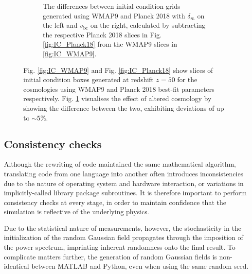 \documentclass[floats,floatfix,showpacs,amssymb,prd,superscriptaddress,nofootinbib, 11pt]{revtex4-2} %
\newcommand{\red}{\textcolor{red}}
\begin{document}
\begin{figure}
\begin{subfigure}[b]{0.9\textwidth}
         \caption{The differences between initial condition grids generated using WMAP9 and Planck 2018 with $\delta_m$ on the left and $v_{\text{bc}}$ on the right, calculated by subtracting the respective Planck 2018 slices in Fig. \ref{fig:IC_Planck18} from the WMAP9 slices in \ref{fig:IC_WMAP9}.}
         \label{fig:IC_difference_WMAP9_Planck18}
     \end{subfigure}
        \caption{Fig. \ref{fig:IC_WMAP9} and Fig. \ref{fig:IC_Planck18} show slices of initial condition boxes generated at redshift $z = 50$ for the cosmologies using WMAP9 and Planck 2018 best-fit parameters respectively. Fig. \ref{fig:IC_difference_WMAP9_Planck18} visualises the effect of altered cosmology by showing the difference between the two, exhibiting deviations of up to $\sim 5 \%$.}
        \label{fig:IC_WMAP9_Planck18}
\end{figure}

\subsection{Consistency checks}
Although the rewriting of code maintained the same mathematical algorithm, translating code from one language into another often introduces inconsistencies due to the nature of operating system and hardware interaction, or variations in implicitly-called library package subroutines. It is therefore important to perform consistency checks at every stage, in order to maintain confidence that the simulation is reflective of the underlying physics.

Due to the statistical nature of measurements, however, the stochasticity in the initialization of the random Gaussian field propagates through the imposition of the power spectrum, imprinting inherent randomness onto the final result. To complicate matters further, the generation of random Gaussian fields is non-identical between MATLAB and Python, even when using the same random seed. 
\end{document}
